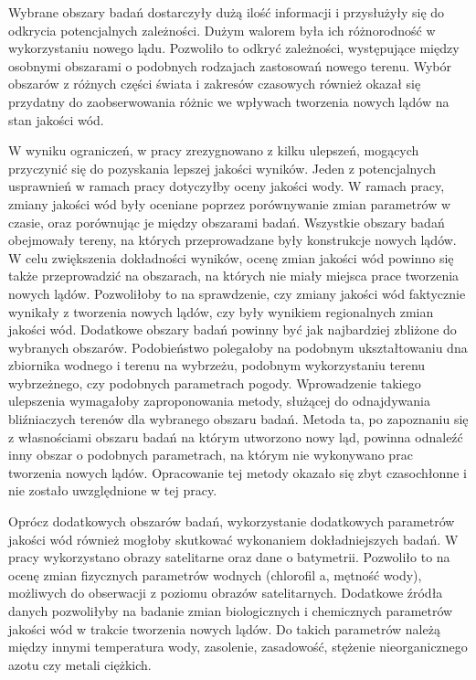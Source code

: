 \documentclass{amuthesis}
\begin{document}
Wybrane obszary badań dostarczyły dużą ilość informacji i przysłużyły
się do odkrycia potencjalnych zależności. Dużym walorem była ich
różnorodność w wykorzystaniu nowego lądu. Pozwoliło to odkryć
zależności, występujące między osobnymi obszarami o podobnych rodzajach
zastosowań nowego terenu. Wybór obszarów z różnych części świata i
zakresów czasowych również okazał się przydatny do zaobserwowania różnic
we wpływach tworzenia nowych lądów na stan jakości wód.

W wyniku ograniczeń, w pracy zrezygnowano z kilku ulepszeń, mogących
przyczynić się do pozyskania lepszej jakości wyników. Jeden z
potencjalnych usprawnień w ramach pracy dotyczyłby oceny jakości wody. W
ramach pracy, zmiany jakości wód były oceniane poprzez porównywanie
zmian parametrów w czasie, oraz porównując je między obszarami badań.
Wszystkie obszary badań obejmowały tereny, na których przeprowadzane
były konstrukcje nowych lądów. W celu zwiększenia dokładności wyników,
ocenę zmian jakości wód powinno się także przeprowadzić na obszarach, na
których nie miały miejsca prace tworzenia nowych lądów. Pozwoliłoby to
na sprawdzenie, czy zmiany jakości wód faktycznie wynikały z tworzenia
nowych lądów, czy były wynikiem regionalnych zmian jakości wód.
Dodatkowe obszary badań powinny być jak najbardziej zbliżone do
wybranych obszarów. Podobieństwo polegałoby na podobnym ukształtowaniu
dna zbiornika wodnego i terenu na wybrzeżu, podobnym wykorzystaniu
terenu wybrzeżnego, czy podobnych parametrach pogody. Wprowadzenie
takiego ulepszenia wymagałoby zaproponowania metody, służącej do
odnajdywania bliźniaczych terenów dla wybranego obszaru badań. Metoda
ta, po zapoznaniu się z własnościami obszaru badań na którym utworzono
nowy ląd, powinna odnaleźć inny obszar o podobnych parametrach, na
którym nie wykonywano prac tworzenia nowych lądów. Opracowanie tej
metody okazało się zbyt czasochłonne i nie zostało uwzględnione w tej
pracy.

Oprócz dodatkowych obszarów badań, wykorzystanie dodatkowych parametrów
jakości wód również mogłoby skutkować wykonaniem dokładniejszych badań.
W pracy wykorzystano obrazy satelitarne oraz dane o batymetrii.
Pozwoliło to na ocenę zmian fizycznych parametrów wodnych (chlorofil a,
mętność wody), możliwych do obserwacji z poziomu obrazów satelitarnych.
Dodatkowe źródła danych pozwoliłyby na badanie zmian biologicznych i
chemicznych parametrów jakości wód w trakcie tworzenia nowych lądów. Do
takich parametrów należą między innymi temperatura wody, zasolenie,
zasadowość, stężenie nieorganicznego azotu czy metali ciężkich.
\end{document}
